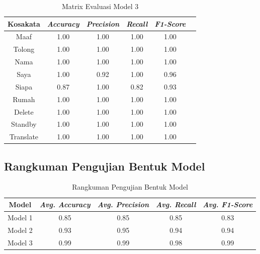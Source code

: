 \newpage
\begin{longtable}{|c|c|c|c|c|c|}
  \caption{Matrix Evaluasi Model 3}
  \label{tb:model3stat}                                   \\
  \hline
  \rowcolor[HTML]{C0C0C0}
  \textbf{Kosakata} & \textbf{\emph{Accuracy}} & \textbf{\emph{Precision}} & \textbf{\emph{Recall}} & \textbf{\emph{F1-Score}} \\
  \hline
  Maaf              & 1.00                       & 1.00                        & 1.00                   & 1.00                \\
  Tolong            & 1.00                       & 1.00                        & 1.00                   & 1.00                \\
  Nama              & 1.00                       & 1.00                        & 1.00                   & 1.00                \\
  Saya              & 1.00                       & 0.92                        & 1.00                   & 0.96                \\
  Siapa             & 0.87                       & 1.00                        & 0.82                   & 0.93                \\
  Rumah             & 1.00                       & 1.00                        & 1.00                   & 1.00                \\
  Delete            & 1.00                       & 1.00                        & 1.00                   & 1.00                \\
  Standby           & 1.00                       & 1.00                        & 1.00                   & 1.00                \\
  Translate         & 1.00                       & 1.00                        & 1.00                   & 1.00                \\
  \hline
\end{longtable}

\subsection{Rangkuman Pengujian Bentuk Model}
\label{sec:analisismodelseluruh}

\begin{longtable}{|c|c|c|c|c|}
  \caption{Rangkuman Pengujian Bentuk Model}
  \label{tb:evaluasiModel}                                   \\
  \hline
  \rowcolor[HTML]{C0C0C0}
  \textbf{Model} & \emph{\textbf{Avg. Accuracy}} & \emph{\textbf{Avg. Precision}} & \emph{\textbf{Avg. Recall}} & \emph{\textbf{Avg. F1-Score}} \\
  \hline
  Model 1 & 0.85 & 0.85 & 0.85 & 0.83 \\
  Model 2 & 0.93 & 0.95 & 0.94 & 0.94 \\
  Model 3 & 0.99 & 0.99 & 0.98 & 0.99 \\
  \hline
\end{longtable}

